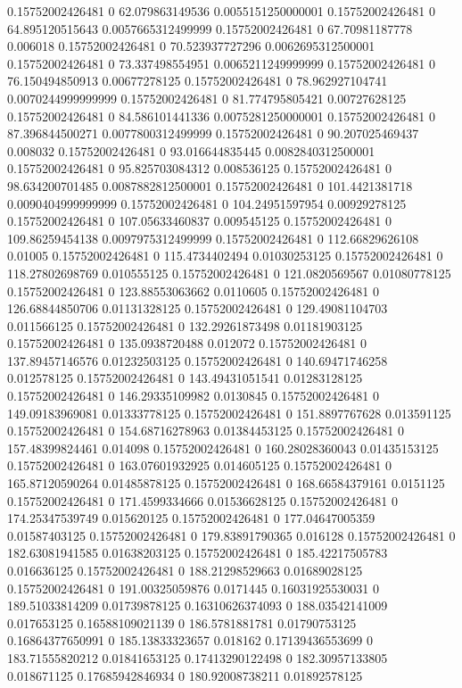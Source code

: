 0.15752002426481 0 62.079863149536 0.0055151250000001
0.15752002426481 0 64.895120515643 0.0057665312499999
0.15752002426481 0 67.70981187778 0.006018
0.15752002426481 0 70.523937727296 0.0062695312500001
0.15752002426481 0 73.337498554951 0.0065211249999999
0.15752002426481 0 76.150494850913 0.00677278125
0.15752002426481 0 78.962927104741 0.0070244999999999
0.15752002426481 0 81.774795805421 0.00727628125
0.15752002426481 0 84.586101441336 0.0075281250000001
0.15752002426481 0 87.396844500271 0.0077800312499999
0.15752002426481 0 90.207025469437 0.008032
0.15752002426481 0 93.016644835445 0.0082840312500001
0.15752002426481 0 95.825703084312 0.008536125
0.15752002426481 0 98.634200701485 0.0087882812500001
0.15752002426481 0 101.4421381718 0.0090404999999999
0.15752002426481 0 104.24951597954 0.00929278125
0.15752002426481 0 107.05633460837 0.009545125
0.15752002426481 0 109.86259454138 0.0097975312499999
0.15752002426481 0 112.66829626108 0.01005
0.15752002426481 0 115.4734402494 0.01030253125
0.15752002426481 0 118.27802698769 0.010555125
0.15752002426481 0 121.0820569567 0.01080778125
0.15752002426481 0 123.88553063662 0.0110605
0.15752002426481 0 126.68844850706 0.01131328125
0.15752002426481 0 129.49081104703 0.011566125
0.15752002426481 0 132.29261873498 0.01181903125
0.15752002426481 0 135.0938720488 0.012072
0.15752002426481 0 137.89457146576 0.01232503125
0.15752002426481 0 140.69471746258 0.012578125
0.15752002426481 0 143.49431051541 0.01283128125
0.15752002426481 0 146.29335109982 0.0130845
0.15752002426481 0 149.09183969081 0.01333778125
0.15752002426481 0 151.8897767628 0.013591125
0.15752002426481 0 154.68716278963 0.01384453125
0.15752002426481 0 157.48399824461 0.014098
0.15752002426481 0 160.28028360043 0.01435153125
0.15752002426481 0 163.07601932925 0.014605125
0.15752002426481 0 165.87120590264 0.01485878125
0.15752002426481 0 168.66584379161 0.0151125
0.15752002426481 0 171.4599334666 0.01536628125
0.15752002426481 0 174.25347539749 0.015620125
0.15752002426481 0 177.04647005359 0.01587403125
0.15752002426481 0 179.83891790365 0.016128
0.15752002426481 0 182.63081941585 0.01638203125
0.15752002426481 0 185.42217505783 0.016636125
0.15752002426481 0 188.21298529663 0.01689028125
0.15752002426481 0 191.00325059876 0.0171445
0.16031925530031 0 189.51033814209 0.01739878125
0.16310626374093 0 188.03542141009 0.017653125
0.16588109021139 0 186.5781881781 0.01790753125
0.16864377650991 0 185.13833323657 0.018162
0.17139436553699 0 183.71555820212 0.01841653125
0.17413290122498 0 182.30957133805 0.018671125
0.17685942846934 0 180.92008738211 0.01892578125
